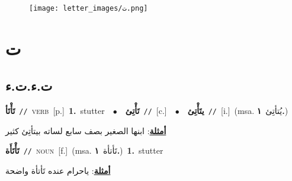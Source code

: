 \documentclass[10pt,a4paper,twoside]{article} %
\begin{document}
\begin{figure*}[t!]\centering\texttt{[image: letter\_images/ت.png]}\end{figure*}
\color{white}

 \section*{\foreignlanguage{arabic}{ت}} 
 \begin{multicols}{2} 

%
\color{black}
\vspace{-3mm}
\subsection*{\color{blue}\foreignlanguage{arabic}{ت.ء.ت.ء}\color{blue}{}} 

{\setlength\topsep{0pt}\textbf{\foreignlanguage{arabic}{تَأْتَأ}}\ {\color{gray}\texttt{//}\color{black}}\ \textsc{verb}\ [p.]\ \textbf{1.}~stutter\ \ $\bullet$\ \ \setlength\topsep{0pt}\textbf{\foreignlanguage{arabic}{تَأْتِئ}}\ {\color{gray}\texttt{//}\color{black}}\ [c.]\ \ $\bullet$\ \ \setlength\topsep{0pt}\textbf{\foreignlanguage{arabic}{يتَأْتِئ}}\ {\color{gray}\texttt{//}\color{black}}\ [i.]\ \color{gray}(msa. \foreignlanguage{arabic}{يُتأتِئ}~\foreignlanguage{arabic}{\textbf{١.}})\color{black}\  \begin{flushright}\color{gray}\foreignlanguage{arabic}{\textbf{\underline{\foreignlanguage{arabic}{أمثلة}}}: ابنها الصغير بصف سابع لساته بيتأتِئ كثير}\end{flushright}\color{black}} \vspace{2mm}

{\setlength\topsep{0pt}\textbf{\foreignlanguage{arabic}{تَأْتَأَة}}\ {\color{gray}\texttt{//}\color{black}}\ \textsc{noun}\ [f.]\ \color{gray}(msa. \foreignlanguage{arabic}{تَأتأة}~\foreignlanguage{arabic}{\textbf{١.}})\color{black}\ \textbf{1.}~stutter\  \begin{flushright}\color{gray}\foreignlanguage{arabic}{\textbf{\underline{\foreignlanguage{arabic}{أمثلة}}}: ياحرام عنده تَأتأة واضحة}\end{flushright}\color{black}} \vspace{2mm}


\end{multicols}
\end{document}
